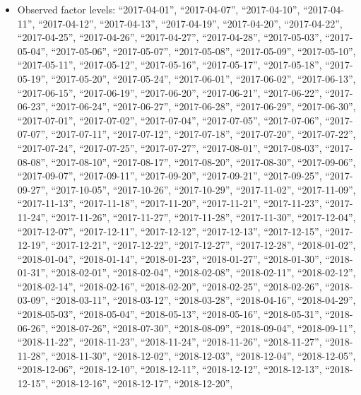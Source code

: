 \documentclass[
  letterpaper,
  DIV=11,
  numbers=noendperiod]{scrartcl}
\providecommand{\tightlist}{%
  \setlength{\itemsep}{0pt}\setlength{\parskip}{0pt}}
\begin{document}
\begin{itemize}
\tightlist
\item
  Observed factor levels: ``2017-04-01'', ``2017-04-07'',
  ``2017-04-10'', ``2017-04-11'', ``2017-04-12'', ``2017-04-13'',
  ``2017-04-19'', ``2017-04-20'', ``2017-04-22'', ``2017-04-25'',
  ``2017-04-26'', ``2017-04-27'', ``2017-04-28'', ``2017-05-03'',
  ``2017-05-04'', ``2017-05-06'', ``2017-05-07'', ``2017-05-08'',
  ``2017-05-09'', ``2017-05-10'', ``2017-05-11'', ``2017-05-12'',
  ``2017-05-16'', ``2017-05-17'', ``2017-05-18'', ``2017-05-19'',
  ``2017-05-20'', ``2017-05-24'', ``2017-06-01'', ``2017-06-02'',
  ``2017-06-13'', ``2017-06-15'', ``2017-06-19'', ``2017-06-20'',
  ``2017-06-21'', ``2017-06-22'', ``2017-06-23'', ``2017-06-24'',
  ``2017-06-27'', ``2017-06-28'', ``2017-06-29'', ``2017-06-30'',
  ``2017-07-01'', ``2017-07-02'', ``2017-07-04'', ``2017-07-05'',
  ``2017-07-06'', ``2017-07-07'', ``2017-07-11'', ``2017-07-12'',
  ``2017-07-18'', ``2017-07-20'', ``2017-07-22'', ``2017-07-24'',
  ``2017-07-25'', ``2017-07-27'', ``2017-08-01'', ``2017-08-03'',
  ``2017-08-08'', ``2017-08-10'', ``2017-08-17'', ``2017-08-20'',
  ``2017-08-30'', ``2017-09-06'', ``2017-09-07'', ``2017-09-11'',
  ``2017-09-20'', ``2017-09-21'', ``2017-09-25'', ``2017-09-27'',
  ``2017-10-05'', ``2017-10-26'', ``2017-10-29'', ``2017-11-02'',
  ``2017-11-09'', ``2017-11-13'', ``2017-11-18'', ``2017-11-20'',
  ``2017-11-21'', ``2017-11-23'', ``2017-11-24'', ``2017-11-26'',
  ``2017-11-27'', ``2017-11-28'', ``2017-11-30'', ``2017-12-04'',
  ``2017-12-07'', ``2017-12-11'', ``2017-12-12'', ``2017-12-13'',
  ``2017-12-15'', ``2017-12-19'', ``2017-12-21'', ``2017-12-22'',
  ``2017-12-27'', ``2017-12-28'', ``2018-01-02'', ``2018-01-04'',
  ``2018-01-14'', ``2018-01-23'', ``2018-01-27'', ``2018-01-30'',
  ``2018-01-31'', ``2018-02-01'', ``2018-02-04'', ``2018-02-08'',
  ``2018-02-11'', ``2018-02-12'', ``2018-02-14'', ``2018-02-16'',
  ``2018-02-20'', ``2018-02-25'', ``2018-02-26'', ``2018-03-09'',
  ``2018-03-11'', ``2018-03-12'', ``2018-03-28'', ``2018-04-16'',
  ``2018-04-29'', ``2018-05-03'', ``2018-05-04'', ``2018-05-13'',
  ``2018-05-16'', ``2018-05-31'', ``2018-06-26'', ``2018-07-26'',
  ``2018-07-30'', ``2018-08-09'', ``2018-09-04'', ``2018-09-11'',
  ``2018-11-22'', ``2018-11-23'', ``2018-11-24'', ``2018-11-26'',
  ``2018-11-27'', ``2018-11-28'', ``2018-11-30'', ``2018-12-02'',
  ``2018-12-03'', ``2018-12-04'', ``2018-12-05'', ``2018-12-06'',
  ``2018-12-10'', ``2018-12-11'', ``2018-12-12'', ``2018-12-13'',
  ``2018-12-15'', ``2018-12-16'', ``2018-12-17'', ``2018-12-20'',

\end{itemize}
\end{document}
